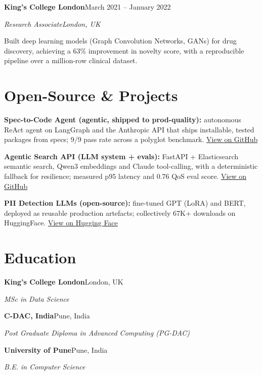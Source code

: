 \documentclass[10pt,a4paper]{article}
\newcommand{\entry}[4]{%
  {\color{company}\bfseries #1}\hfill {\color{muted}#2}\par
  \vspace{1pt}
  {\itshape #3}\hfill {\color{muted}\itshape #4}\par
  \vspace{3pt}%
}
\begin{document}
\entry{King's College London}{March 2021 -- January 2022}{Research Associate}{London, UK}
\begin{tight}
  \item Built deep learning models (Graph Convolution Networks, GANs) for drug discovery, achieving a 63\% improvement in novelty score, with a reproducible pipeline over a million-row clinical dataset.
\end{tight}

\section{Open-Source \& Projects}
\begin{tight}
  \item \textbf{Spec-to-Code Agent (agentic, shipped to prod-quality):} autonomous ReAct agent on LangGraph and the Anthropic API that ships installable, tested packages from specs; 9/9 pass rate across a polyglot benchmark. \href{https://github.com/abhijeetscode/Spec-to-Code-Agent}{View on GitHub}
  \item \textbf{Agentic Search API (LLM system + evals):} FastAPI + Elasticsearch semantic search, Qwen3 embeddings and Claude tool-calling, with a deterministic fallback for resilience; measured p95 latency and 0.76 QoS eval score. \href{https://github.com/abhijeetscode/search-agent}{View on GitHub}
  \item \textbf{PII Detection LLMs (open-source):} fine-tuned GPT (LoRA) and BERT, deployed as reusable production artefacts; collectively 67K+ downloads on HuggingFace. \href{https://huggingface.co/ab-ai/pii_model}{View on Hugging Face}
\end{tight}

\section{Education}
{\color{company}\bfseries King's College London}\hfill {\color{muted}London, UK}\par
{\itshape MSc in Data Science}\par\vspace{2pt}
{\color{company}\bfseries C-DAC, India}\hfill {\color{muted}Pune, India}\par
{\itshape Post Graduate Diploma in Advanced Computing (PG-DAC)}\par\vspace{2pt}
{\color{company}\bfseries University of Pune}\hfill {\color{muted}Pune, India}\par
{\itshape B.E. in Computer Science}\par
\end{document}
